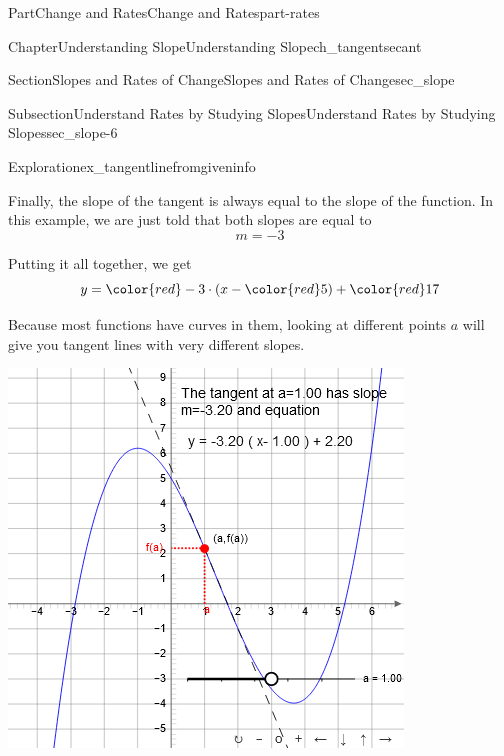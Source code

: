 \documentclass{tufte-book}
\numberwithin{equation}{chapter}
\begin{document}
\begin{partptx}{Part}{Change and Rates}{}{Change and Rates}{}{}{part-rates}
\begin{chapterptx}{Chapter}{Understanding Slope}{}{Understanding Slope}{}{}{ch_tangentsecant}
\begin{sectionptx}{Section}{Slopes and Rates of Change}{}{Slopes and Rates of Change}{}{}{sec_slope}
\begin{subsectionptx}{Subsection}{Understand Rates by Studying Slopes}{}{Understand Rates by Studying Slopes}{}{}{sec_slope-6}
\begin{exploration}{Exploration}{}{ex_tangentlinefromgiveninfo}
%
\par
Finally, the slope of the tangent is always equal to the slope of the function.  In this example, we are just told that both slopes are equal to%
\begin{equation*}
m = -3 
\end{equation*}
%
\par
Putting it all together, we get%
\begin{equation*}
y = {\color{red} -3} \cdot (x - {\color{red} 5}) + {\color{red} 17}
\end{equation*}
%
\end{exploration}%
Because most functions have curves in them, looking at different points \(a\) will give you tangent lines with very different slopes.%
\begin{sidebyside}{2}{0.075}{0.075}{0.17}%
\begin{sbspanel}{0.47}%
\includegraphics[width=\linewidth]{external/jsxgraph-slope-via-tangent.png}
\end{sbspanel}%
\begin{sbspanel}{0.21}%

\end{sbspanel}
\end{sidebyside}
\end{subsectionptx}
\end{sectionptx}
\end{chapterptx}
\end{partptx}
\end{document}
